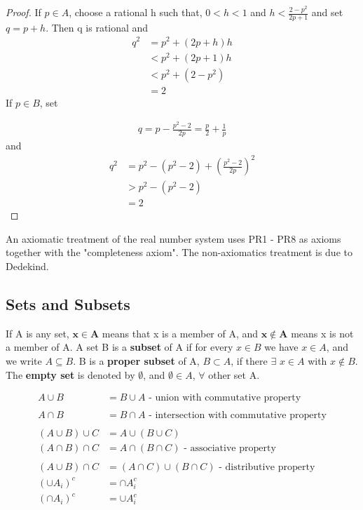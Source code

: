 \documentclass[11pt,fleqn]{book} %
\begin{document}
\begin{proof}
	If $p \in A$, choose a rational h such that, $0<h<1$ and $h<\frac{2-p^2}{2p+1}$ and set $q=p+h$. Then q is rational and 
	\begin{align*}
		q^2 &= p^2 + (2p+h)h\\
		&< p^2 + (2p+1)h\\
		&< p^2 + (2-p^2)\\
		&= 2
	\end{align*}
	If $p \in B$, set
	
	\begin{align*}
			 q= p- \frac{p^2 - 2}{2p} = \frac{p}{2} + \frac{1}{p}
	\end{align*}
	and
	\begin{align*}
		q^2 &= p^2 - (p^2 - 2) + (\frac{p^2 - 2}{2p})^2\\
		&> p^2 - (p^2 -2)\\
		&= 2
	\end{align*}
\end{proof}

\begin{remark}
	An axiomatic treatment of the real number system uses PR1 - PR8 as axioms together with the "completeness axiom". The non-axiomatics treatment is due to Dedekind.
\end{remark}


\subsection{Sets and Subsets}

If A is any set, $\mathbf{x \in A}$ means that x is a member of A, and $\mathbf{x \notin A}$ means x is not a member of A. A set B is a \textbf{subset} of A if for every $x \in B$ we have $x \in A$, and we write $A \subseteq B$. B is a \textbf{proper subset} of A, $B \subset A$, if there $\exists$ $x \in A$ with $x \notin B$. The \textbf{empty set} is denoted by $\emptyset$, and $\emptyset \in A$, $\forall$ other set A.

\begin{align*}
	A \cup B &= B \cup A \text{ - union with commutative property}\\
	\\
	A \cap B &= B \cap A \text{ - intersection with commutative property}\\
	\\
	(A \cup B)\cup C &= A\cup(B \cup C)\\
	(A \cap B)\cap C &= A\cap(B \cap C) \text{ - associative property}\\
	\\
	 (A \cup B)\cap C &= (A\cap C)\cup(B \cap C) \text{ - distributive property}\\
	 (\cup A_i)^c &= \cap A_i^c\\
	 (\cap A_i)^c &= \cup A_i^c\\
\end{align*}
\end{document}
